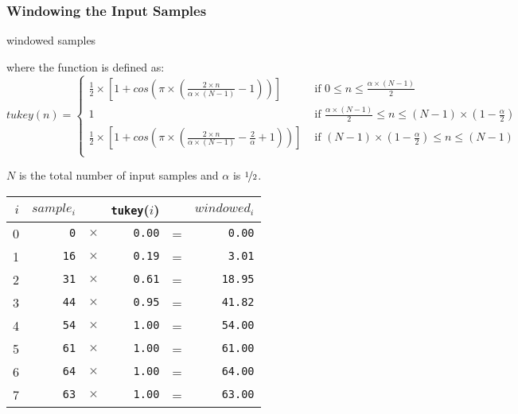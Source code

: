 \subsubsection{Windowing the Input Samples}
{
\Return windowed samples\;
\EALGORITHM
\par
\noindent
where the  function is defined as:
\begin{equation*}
tukey(n) =
\begin{cases}
\frac{1}{2} \times \left[1 + cos\left(\pi \times \left(\frac{2 \times n}{\alpha \times (N - 1)} - 1 \right)\right)\right] & \text{ if } 0 \leq n \leq \frac{\alpha \times (N - 1)}{2} \\
1 & \text{ if } \frac{\alpha \times (N - 1)}{2} \leq n \leq (N - 1) \times (1 - \frac{\alpha}{2}) \\
\frac{1}{2} \times \left[1 + cos\left(\pi \times \left(\frac{2 \times n}{\alpha \times (N - 1)} - \frac{2}{\alpha} + 1 \right)\right)\right] & \text{ if } (N - 1) \times (1 - \frac{\alpha}{2}) \leq n \leq (N - 1) \\
\end{cases}
\end{equation*}
\par
\noindent
$N$ is the total number of input samples and $\alpha$ is $\nicefrac{1}{2}$.
\par
\noindent
{
\begin{tabular}{r|rcrcr}
$i$ & $sample_i$ & & \texttt{tukey}($i$) & & $windowed_i$ \\
\hline
0 & \texttt{0} & $\times$ & \texttt{0.00} & = & \texttt{0.00} \\
1 & \texttt{16} & $\times$ & \texttt{0.19} & = & \texttt{3.01} \\
2 & \texttt{31} & $\times$ & \texttt{0.61} & = & \texttt{18.95} \\
3 & \texttt{44} & $\times$ & \texttt{0.95} & = & \texttt{41.82} \\
4 & \texttt{54} & $\times$ & \texttt{1.00} & = & \texttt{54.00} \\
5 & \texttt{61} & $\times$ & \texttt{1.00} & = & \texttt{61.00} \\
6 & \texttt{64} & $\times$ & \texttt{1.00} & = & \texttt{64.00} \\
7 & \texttt{63} & $\times$ & \texttt{1.00} & = & \texttt{63.00} \\

\end{tabular}}}
